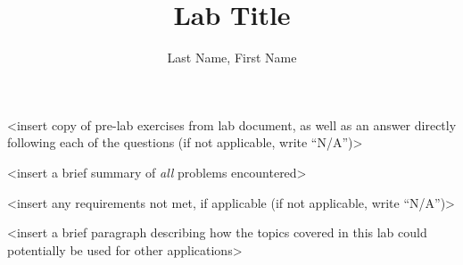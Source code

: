 \documentclass{3701lab}
\author{Last Name, First Name}
\title{\textcolor{wordpurple}{Lab Title}}
\begin{document}
	\begingroup \renewcommand{\newpage}{}
  \begin{questions}
    \noindent <insert copy of pre-lab exercises from lab document, as well as an answer directly following each of the questions (if not applicable, write “N/A”)>
		\vspace{70pt}
  \end{questions}
  \begin{problems}
    \noindent <insert a brief summary of \textit{all} problems encountered>
  \end{problems}
  \begin{notmet}
		\noindent <insert any requirements not met, if applicable (if not applicable, write “N/A”)>
  \end{notmet}
  \begin{future}
		\noindent <insert a brief paragraph describing how the topics covered in this lab could potentially be used for other \linebreak applications>
		\vspace{70pt}
  \end{future}
  \begin{requirements}

  \end{requirements}
	\endgroup
\end{document}
